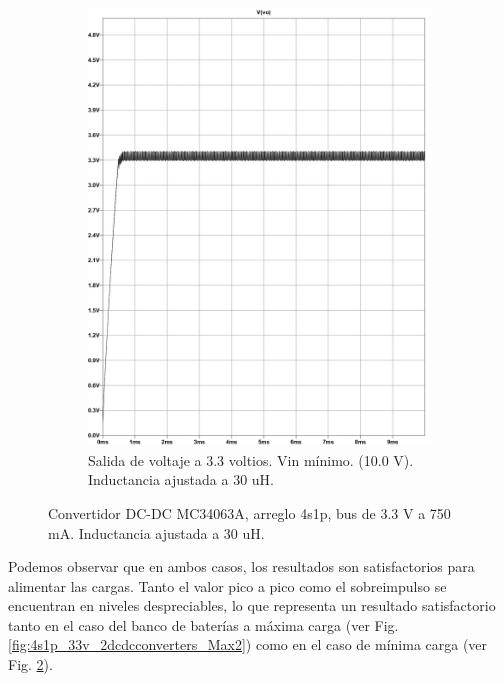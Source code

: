 \begin{figure}[h]
\begin{subfigure}{0.48\linewidth}
    \includegraphics[width=\textwidth]{Pictures/Ajustada1_Min.jpg}
    \caption{Salida de voltaje a 3.3 voltios. Vin mínimo. (10.0 V). Inductancia ajustada a 30 uH.}
    \label{fig:4s1p_33v_2dcdcconverters_min2}
  \end{subfigure}
  \caption{Convertidor DC-DC MC34063A, arreglo 4s1p, bus de 3.3 V a 750 mA. Inductancia ajustada a 30 uH.}
  \label{fig:ConveridorDCDC_4S1P_33V_ajustada}
\end{figure}

Podemos observar que en ambos casos, los resultados son satisfactorios para alimentar las cargas. Tanto el valor pico a pico como el sobreimpulso se encuentran en niveles despreciables, lo que representa un resultado satisfactorio tanto en el caso del banco de baterías a máxima carga (ver Fig. \ref{fig:4s1p_33v_2dcdcconverters_Max2}) como en el caso de mínima carga (ver Fig. \ref{fig:ConveridorDCDC_4S1P_33V_ajustada}).

\newpage


